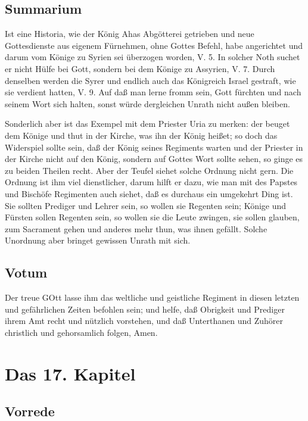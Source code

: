 \section{Summarium}

Ist eine Historia, wie der König Ahas Abgötterei getrieben und neue Gottesdienste aus eigenem Fürnehmen, ohne Gottes Befehl, habe angerichtet und darum vom Könige zu Syrien sei überzogen worden, V. 5. In solcher Noth suchet er nicht Hülfe bei Gott, sondern bei dem Könige zu Assyrien, V. 7. Durch denselben werden die Syrer und endlich auch das Königreich Israel gestraft, wie sie verdient hatten, V. 9. Auf daß man lerne fromm sein, Gott fürchten und nach seinem Wort sich halten, sonst würde dergleichen Unrath nicht außen bleiben.

Sonderlich aber ist das Exempel mit dem Priester Uria zu merken: der beuget dem Könige und thut in der Kirche, was ihn der König heißet; so doch das Widerspiel sollte sein, daß der König seines Regiments warten und der Priester in der Kirche nicht auf den König, sondern auf Gottes Wort sollte sehen, so ginge es zu beiden Theilen recht. Aber der Teufel siehet solche Ordnung nicht gern. Die Ordnung ist ihm viel dienstlicher, darum hilft er dazu, wie man mit des Papstes und Bischöfe Regimenten auch siehet, daß es durchaus ein umgekehrt Ding ist. Sie sollten Prediger und Lehrer sein, so wollen sie Regenten sein; Könige und Fürsten sollen Regenten sein, so wollen sie die Leute zwingen, sie sollen glauben, zum Sacrament gehen und anderes mehr thun, was ihnen gefällt. Solche Unordnung aber bringet gewissen Unrath mit sich.

\section{Votum}

Der treue GOtt lasse ihm das weltliche und geistliche Regiment in diesen letzten und gefährlichen Zeiten befohlen sein; und helfe, daß Obrigkeit und Prediger ihrem Amt recht und nützlich vorstehen, und daß Unterthanen und Zuhörer christlich und gehorsamlich folgen, Amen.

\chapter{Das 17. Kapitel}

\section{Vorrede}

